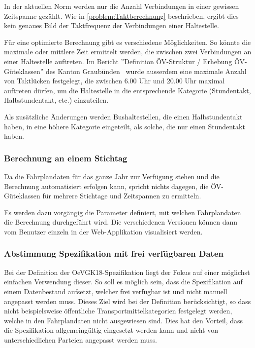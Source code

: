 In der aktuellen Norm werden nur die Anzahl Verbindungen in einer gewissen Zeitspanne gezählt.
Wie in \ref{problem:Taktberechnung} beschrieben, ergibt dies kein genaues Bild der Taktfrequenz der Verbindungen einer Haltestelle.

Für eine optimierte Berechnung gibt es verschiedene Möglichkeiten.
So könnte die maximale oder mittlere Zeit ermittelt werden, die zwischen zwei Verbindungen an einer Haltestelle auftreten.
Im Bericht ''Definition ÖV-Struktur / Erhebung ÖV-Güteklassen'' des Kanton Graubünden~\cite{oev-guteklasse-gr} wurde ausserdem eine maximale Anzahl von Taktlücken festgelegt, die zwischen 6.00 Uhr und 20.00 Uhr maximal auftreten dürfen, um die Haltestelle in die entsprechende Kategorie (Stundentakt, Halbstundentakt, etc.) einzuteilen.

Als zusätzliche Änderungen werden Bushaltestellen, die einen Halbstundentakt haben, in eine höhere Kategorie eingeteilt, als solche, die nur einen Stundentakt haben.


\subsubsection{Berechnung an einem Stichtag}
\label{solution:Berechnung an einem Stichtag}

Da die Fahrplandaten für das ganze Jahr zur Verfügung stehen und die Berechnung automatisiert erfolgen kann, spricht nichts dagegen, die \acs{ÖV}-Güteklassen für mehrere Stichtage und Zeitspannen zu ermitteln.

Es werden dazu vorgängig die Parameter definiert, mit welchen Fahrplandaten die Berechnung durchgeführt wird.
Die verschiedenen Versionen können dann vom Benutzer einzeln in der Web-Applikation visualisiert werden.

\subsubsection{Abstimmung Spezifikation mit frei verfügbaren Daten}
\label{solution:Abstimmung Spezifikation mit frei verfügbaren Daten}

Bei der Definition der \gls{OeVGK18}-Spezifikation liegt der Fokus auf einer möglichst einfachen Verwendung dieser. 
So soll es möglich sein, dass die Spezifikation auf einem Datenbestand aufsetzt, welcher frei verfügbar ist und nicht manuell angepasst werden muss.
Dieses Ziel wird bei der Definition berücksichtigt, so dass nicht beispielsweise öffentliche Transportmittelkategorien festgelegt werden, welche in den Fahrplandaten nicht ausgewiesen sind.
Dies hat den Vorteil, dass die Spezifikation allgemeingültig eingesetzt werden kann und nicht von unterschiedlichen Parteien angepasst werden muss.

